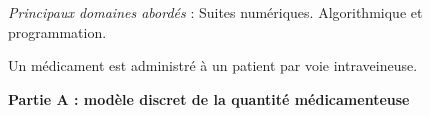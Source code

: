 
\medskip

\emph{Principaux domaines abordés} : Suites numériques. Algorithmique et programmation.

\medskip

Un médicament est administré à un patient par voie intraveineuse. 

\bigskip

\textbf{Partie A : modèle discret de la quantité médicamenteuse}

\medskip

%
%
%
%

